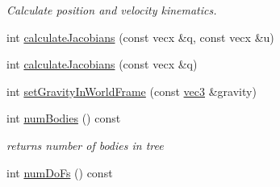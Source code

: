 \begin{CompactItemize}
\begin{CompactList}\small\item\em Calculate position and velocity kinematics. \item\end{CompactList}\item 
int \hyperlink{classbt_inverse_dynamics_1_1_multi_body_tree_b28d924ffc2226b224e2046497162227}{calculateJacobians} (const vecx \&q, const vecx \&u)
\item 
int \hyperlink{classbt_inverse_dynamics_1_1_multi_body_tree_d036684dcd9a68f732bc37ba2a4ed894}{calculateJacobians} (const vecx \&q)
\item 
int \hyperlink{classbt_inverse_dynamics_1_1_multi_body_tree_103b593ab2c8759489fbf6673f664288}{setGravityInWorldFrame} (const \hyperlink{classbt_inverse_dynamics_1_1vec3}{vec3} \&gravity)
\item 
\hypertarget{classbt_inverse_dynamics_1_1_multi_body_tree_bfc83ec7cbf274ba67c4fe234bca2041}{
int \hyperlink{classbt_inverse_dynamics_1_1_multi_body_tree_bfc83ec7cbf274ba67c4fe234bca2041}{numBodies} () const }
\label{classbt_inverse_dynamics_1_1_multi_body_tree_bfc83ec7cbf274ba67c4fe234bca2041}

\begin{CompactList}\small\item\em returns number of bodies in tree \item\end{CompactList}\item 
\hypertarget{classbt_inverse_dynamics_1_1_multi_body_tree_84caec9630c1db03d88c068bf39be9df}{
int \hyperlink{classbt_inverse_dynamics_1_1_multi_body_tree_84caec9630c1db03d88c068bf39be9df}{numDoFs} () const }
\label{classbt_inverse_dynamics_1_1_multi_body_tree_84caec9630c1db03d88c068bf39be9df}


\end{CompactItemize}
